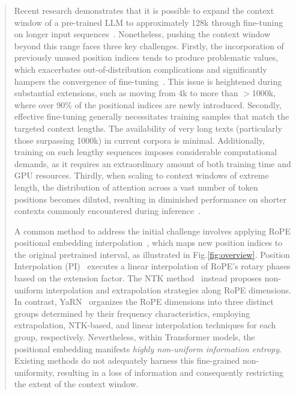 \begin{abstract}
Recent research demonstrates that it is possible to expand the context window of a pre-trained LLM to approximately 128k through fine-tuning on longer input sequences~\cite{longlora,pi,yarn,zhang2024soaring,liu2023scaling}. Nonetheless, pushing the context window beyond this range faces three key challenges. Firstly, the incorporation of previously unused position indices tends to produce problematic values, which exacerbates out-of-distribution complications and significantly hampers the convergence of fine-tuning~\cite{pi}. This issue is heightened during substantial extensions, such as moving from 4k to more than $>$1000k, where over 90\% of the positional indices are newly introduced. Secondly, effective fine-tuning generally necessitates training samples that match the targeted context lengths. The availability of very long texts (particularly those surpassing 1000k) in current corpora is minimal. Additionally, training on such lengthy sequences imposes considerable computational demands, as it requires an extraordinary amount of both training time and GPU resources. Thirdly, when scaling to context windows of extreme length, the distribution of attention across a vast number of token positions becomes diluted, resulting in diminished performance on shorter contexts commonly encountered during inference~\cite{pi}.

A common method to address the initial challenge involves applying RoPE positional embedding interpolation~\cite{rope,pi}, which maps new position indices to the original pretrained interval, as illustrated in Fig.\ref{fig:overview}. Position Interpolation (PI)~\cite{pi} executes a linear interpolation of RoPE’s rotary phases based on the extension factor. The NTK method~\cite{ntk,dynamicntk} instead proposes non-uniform interpolation and extrapolation strategies along RoPE dimensions. In contrast, YaRN~\cite{yarn} organizes the RoPE dimensions into three distinct groups determined by their frequency characteristics, employing extrapolation, NTK-based, and linear interpolation techniques for each group, respectively. Nevertheless, within Transformer models, the positional embedding manifests \emph{highly non-uniform information entropy}. Existing methods do not adequately harness this fine-grained non-uniformity, resulting in a loss of information and consequently restricting the extent of the context window.


\end{abstract}
